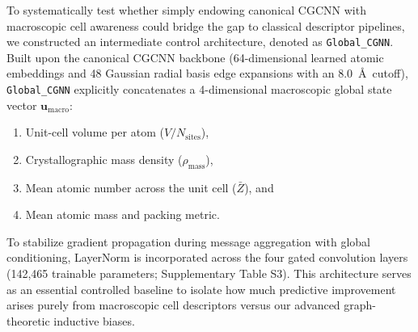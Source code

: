 \documentclass[final,3p,times]{elsarticle}
\begin{document}
To systematically test whether simply endowing canonical CGCNN with macroscopic cell awareness could bridge the gap to classical descriptor pipelines, we constructed an intermediate control architecture, denoted as \texttt{Global\_CGNN}. Built upon the canonical CGCNN backbone (64-dimensional learned atomic embeddings and 48 Gaussian radial basis edge expansions with an $8.0$~\AA\ cutoff), \texttt{Global\_CGNN} explicitly concatenates a 4-dimensional macroscopic global state vector $\mathbf{u}_{\mathrm{macro}}$:
\begin{enumerate}
    \item Unit-cell volume per atom ($V / N_{\mathrm{sites}}$),
    \item Crystallographic mass density ($\rho_{\mathrm{mass}}$),
    \item Mean atomic number across the unit cell ($\bar{Z}$), and
    \item Mean atomic mass and packing metric.
\end{enumerate}
To stabilize gradient propagation during message aggregation with global conditioning, LayerNorm is incorporated across the four gated convolution layers (142,465 trainable parameters; Supplementary Table S3). This architecture serves as an essential controlled baseline to isolate how much predictive improvement arises purely from macroscopic cell descriptors versus our advanced graph-theoretic inductive biases.
\end{document}
